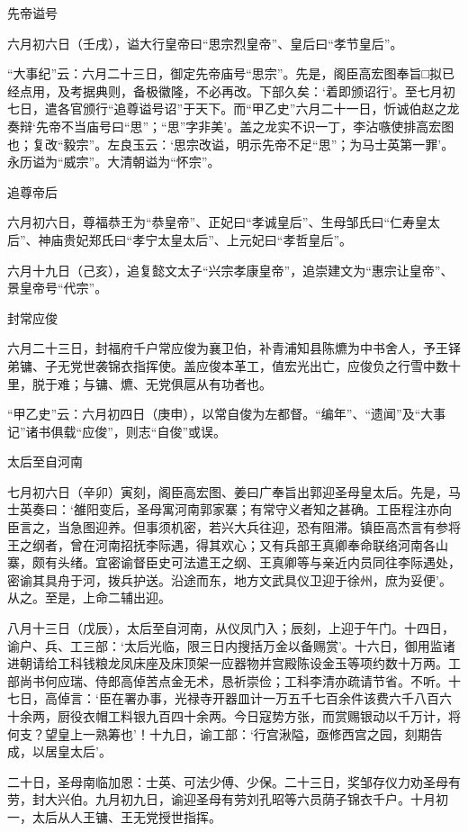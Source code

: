 \documentclass[]{article}
\begin{document}
先帝谥号

六月初六日（壬戌），谥大行皇帝曰``思宗烈皇帝''、皇后曰``孝节皇后''。

``大事纪''云：六月二十三日，御定先帝庙号``思宗''。先是，阁臣高宏图奉旨□拟已经点用，及考据典则，备极徽隆，不必再改。下部久矣：`着即颁诏行'。至七月初七日，遣各官颁行``追尊谥号诏''于天下。而``甲乙史''六月二十一日，忻诚伯赵之龙奏辩`先帝不当庙号曰``思''；``思''字非美'。盖之龙实不识一丁，李沾嗾使排高宏图也；复改``毅宗''。左良玉云：`思宗改谥，明示先帝不足``思''；为马士英第一罪'。永历谥为``威宗''。大清朝谥为``怀宗''。

追尊帝后

六月初六日，尊福恭王为``恭皇帝''、正妃曰``孝诚皇后''、生母邹氏曰``仁寿皇太后''、神庙贵妃郑氏曰``孝宁太皇太后''、上元妃曰``孝哲皇后''。

六月十九日（己亥），追复懿文太子``兴宗孝康皇帝''，追崇建文为``惠宗让皇帝''、景皇帝号``代宗''。

封常应俊

六月二十三日，封福府千户常应俊为襄卫伯，补青浦知县陈爊为中书舍人，予王铎弟镛、子无党世袭锦衣指挥使。盖应俊本革工，值宏光出亡，应俊负之行雪中数十里，脱于难；与镛、爊、无党俱扈从有功者也。

``甲乙史''云：六月初四日（庚申），以常自俊为左都督。``编年''、``遗闻''及``大事记''诸书俱载``应俊''，则志``自俊''或误。

太后至自河南

七月初六日（辛卯）寅刻，阁臣高宏图、姜曰广奉旨出郭迎圣母皇太后。先是，马士英奏曰：`雒阳变后，圣母寓河南郭家寨；有常守义者知之甚确。工臣程注亦向臣言之，当急图迎养。但事须机密，若兴大兵往迎，恐有阻滞。镇臣高杰言有参将王之纲者，曾在河南招抚李际遇，得其欢心；又有兵部王真卿奉命联络河南各山寨，颇有头绪。宜密谕督臣史可法遣王之纲、王真卿等与亲近内员同往李际遇处，密谕其具舟于河，拨兵护送。沿途而东，地方文武具仪卫迎于徐州，庶为妥便'。从之。至是，上命二辅出迎。

八月十三日（戊辰），太后至自河南，从仪凤门入；辰刻，上迎于午门。十四日，谕户、兵、工三部：`太后光临，限三日内搜括万金以备赐赏'。十六日，御用监诸进朝请给工科钱粮龙凤床座及床顶架一应器物并宫殿陈设金玉等项约数十万两。工部尚书何应瑞、侍郎高倬苦点金无术，恳祈崇俭；工科李清亦疏请节省。不听。十七日，高倬言：`臣在署办事，光禄寺开器皿计一万五千七百余件该费六千八百六十余两，厨役衣帽工料银九百四十余两。今日寇势方张，而赏赐银动以千万计，将何支？望皇上一熟筹也'！十九日，谕工部：`行宫湫隘，亟修西宫之园，刻期告成，以居皇太后'。

二十日，圣母南临加恩：士英、可法少傅、少保。二十三日，奖邹存仪力劝圣母有劳，封大兴伯。九月初九日，谕迎圣母有劳刘孔昭等六员荫子锦衣千户。十月初一，太后从人王镛、王无党授世指挥。
\end{document}

